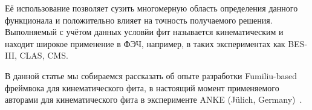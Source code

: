 Её использование позволяет сузить многомерную область определения данного функционала и положительно влияет на точность получаемого решения. Выполняемый с учётом данных условйи фит называется кинематическим и находит широкое применение в ФЭЧ, например, в таких экспериментах как
BES-III, %
CLAS, %
CMS. %


В данной статье мы собираемся рассказать об опыте разработки Fumiliu-based фреймвока для кинематического фита, в настоящий момент применяемого авторами для кинематического фита в эксперименте ANKE (Jülich, Germany)~\cite{anke}.
